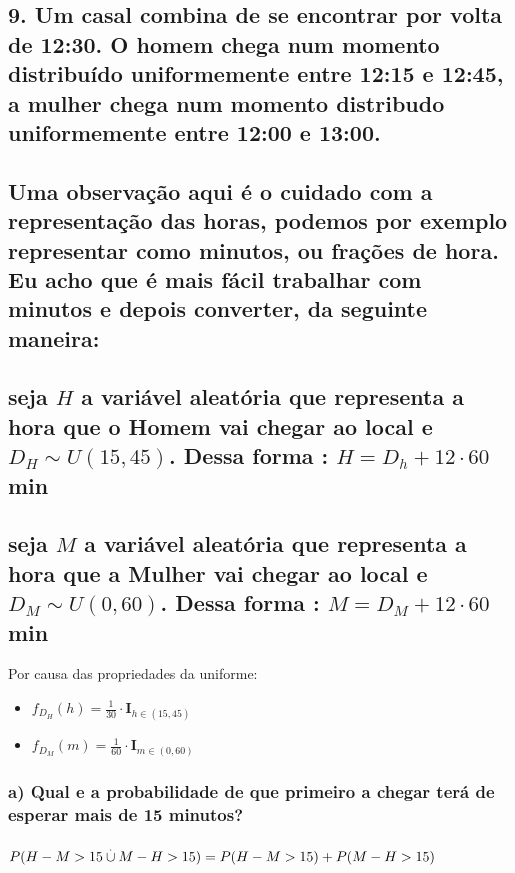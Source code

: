 \documentclass[english]{article}
\begin{document}
\subsection*{\textmd{9. Um casal combina de se encontrar por volta de 12:30. O
homem chega num momento distribuído uniformemente entre 12:15 e 12:45,
a mulher chega num momento distribudo uniformemente entre 12:00 e
13:00. }}


\subsection*{\textmd{Uma observação aqui é o cuidado com a representação das horas,
podemos por exemplo representar como minutos, ou frações de hora.
Eu acho que é mais fácil trabalhar com minutos e depois converter,
da seguinte maneira:}}


\subsection*{\textmd{seja $H$ a variável aleatória que representa a hora que
o Homem vai chegar ao local e $D{}_{H}\sim U(15,45)$. Dessa forma
: $H=D_{h}+12\cdot60$ min}}


\subsection*{\textmd{seja $M$ a variável aleatória que representa a hora que
a Mulher vai chegar ao local e $D{}_{M}\sim U(0,60)$. Dessa forma
: $M=D_{M}+12\cdot60$ min}}

Por causa das propriedades da uniforme:
\begin{itemize}
\item $f_{D{}_{H}}(h)=\frac{1}{30}\cdot\mathbf{I}_{h\in(15,45)}$
\item $f_{D{}_{M}}(m)=\frac{1}{60}\cdot\mathbf{I}_{m\in(0,60)}$
\end{itemize}

\subsubsection*{\textmd{a) Qual e a probabilidade de que primeiro a chegar terá de
esperar mais de 15 minutos? }}


\subsubsection*{\textmd{$P(H-M>15\protect\overset{.}{\cup}M-H>15)=P(H-M>15)+P(M-H>15)$}}
\end{document}
